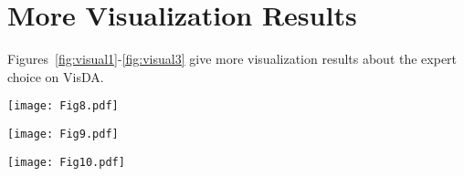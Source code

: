 \documentclass[10pt,twocolumn,letterpaper]{article}
\begin{document}
\section{More Visualization Results}

Figures~\ref{fig:visual1}-\ref{fig:visual3} give more visualization results about the expert choice on VisDA.

\begin{figure*}[ht]    \centering
    \texttt{[image: Fig8.pdf]}
    \caption{\textbf{Visualization of expert choice} on the source domain of VisDA.  Different colors represent different dominate experts.}\label{fig:visual1}
\end{figure*}

\begin{figure*}[ht]\centering
\texttt{[image: Fig9.pdf]}
\caption{\textbf{Visualization of expert choice} on the target domain known class samples of VisDA. Different colors represent different dominate experts.}\label{fig:visual2}
\end{figure*}

\begin{figure*}[ht]    \centering
    \texttt{[image: Fig10.pdf]}
    \caption{\textbf{Visualization of expert choice} on the target domain unknown class samples of VisDA. Different colors represent different dominate experts.}\label{fig:visual3}
\end{figure*}
\end{document}
